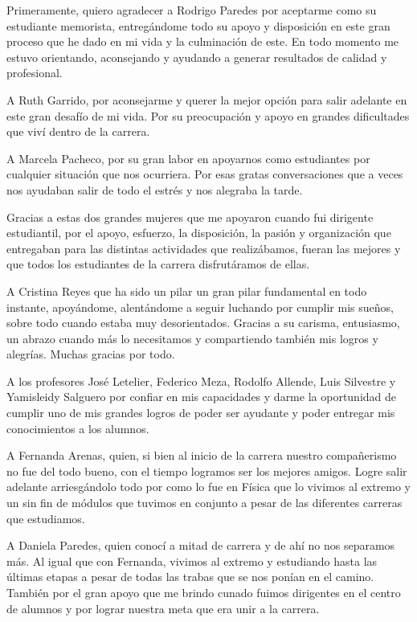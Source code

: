 
\begin{acknowledgment}
    Primeramente, quiero agradecer a Rodrigo Paredes por aceptarme como su estudiante memorista, entregándome todo su apoyo y disposición en este gran proceso que he dado en mi vida y la culminación de este. En todo momento me estuvo orientando, aconsejando y ayudando a generar resultados de calidad y profesional.

    A Ruth Garrido, por aconsejarme y querer la mejor opción para salir adelante en este gran desafío de mi vida. Por su preocupación y apoyo en grandes dificultades que viví dentro de la carrera.

    A Marcela Pacheco, por su gran labor en apoyarnos como estudiantes por cualquier situación que nos ocurriera. Por esas gratas conversaciones que a veces nos ayudaban salir de todo el estrés y nos alegraba la tarde.

    Gracias a estas dos grandes mujeres que me apoyaron cuando fui dirigente estudiantil, por el apoyo, esfuerzo, la disposición, la pasión y organización que entregaban para las distintas actividades que realizábamos, fueran las mejores y que todos los estudiantes de la carrera disfrutáramos de ellas.

    A Cristina Reyes que ha sido un pilar un gran pilar fundamental en todo instante, apoyándome, alentándome a seguir luchando por cumplir mis sueños, sobre todo cuando estaba muy desorientados. Gracias a su carisma, entusiasmo, un abrazo cuando más lo necesitamos y compartiendo también mis logros y alegrías. Muchas gracias por todo.

    A los profesores José Letelier, Federico Meza, Rodolfo Allende, Luis Silvestre y Yamisleidy Salguero por confiar en mis capacidades y darme la oportunidad de cumplir uno de mis grandes logros de poder ser ayudante y poder entregar mis conocimientos a los alumnos.

    A Fernanda Arenas, quien, si bien al inicio de la carrera nuestro compañerismo no fue del todo bueno, con el tiempo logramos ser los mejores amigos. Logre salir adelante arriesgándolo todo por como lo fue en Física que lo vivimos al extremo y un sin fin de módulos que tuvimos en conjunto a pesar de las diferentes carreras que estudiamos.

    A Daniela Paredes, quien conocí a mitad de carrera y de ahí no nos separamos más. Al igual que con Fernanda, vivimos al extremo y estudiando hasta las últimas etapas a pesar de todas las trabas que se nos ponían en el camino. También por el gran apoyo que me brindo cunado fuimos dirigentes en el centro de alumnos y por lograr nuestra meta que era unir a la carrera.


\end{acknowledgment}
